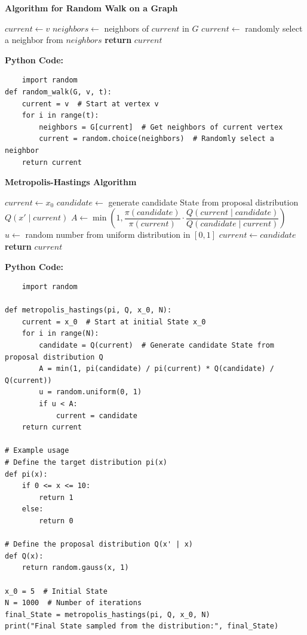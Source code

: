 \documentclass[12pt]{book} %
\begin{document}
\textbf{Algorithm for Random Walk on a Graph}
\FloatBarrier
\begin{algorithm}[H]
\caption{Random Walk on a Graph}
\begin{algorithmic}[1]
    \State $current \gets v$ 
        \State $neighbors \gets$ neighbors of $current$ in $G$
        \State $current \gets$ randomly select a neighbor from $neighbors$
    \EndFor
    \State \textbf{return} $current$
\EndFunction
\end{algorithmic}
\end{algorithm}
\FloatBarrier
\textbf{Python Code:}
\FloatBarrier
\begin{lstlisting}
    import random
def random_walk(G, v, t):
    current = v  # Start at vertex v
    for i in range(t):
        neighbors = G[current]  # Get neighbors of current vertex
        current = random.choice(neighbors)  # Randomly select a neighbor
    return current
\end{lstlisting}
\FloatBarrier
\textbf{Metropolis-Hastings Algorithm}
\FloatBarrier
\begin{algorithm}[H]
\caption{Metropolis-Hastings Algorithm}
\begin{algorithmic}[1]
    \State $current \gets x_0$ 
        \State $candidate \gets$ generate candidate State from proposal distribution \(Q(x' \mid current)\)
        \State $A \gets \min\left(1, \dfrac{\pi(candidate)}{\pi(current)} \cdot \dfrac{Q(current \mid candidate)}{Q(candidate \mid current)}\right)$
        \State $u \gets$ random number from uniform distribution in $[0, 1]$
            \State $current \gets candidate$
        \EndIf
    \EndFor
    \State \textbf{return} $current$
\EndFunction
\end{algorithmic}
\end{algorithm}
\FloatBarrier
\textbf{Python Code:}
\FloatBarrier
\begin{lstlisting}
    import random

def metropolis_hastings(pi, Q, x_0, N):
    current = x_0  # Start at initial State x_0
    for i in range(N):
        candidate = Q(current)  # Generate candidate State from proposal distribution Q
        A = min(1, pi(candidate) / pi(current) * Q(candidate) / Q(current))
        u = random.uniform(0, 1)
        if u < A:
            current = candidate
    return current

# Example usage
# Define the target distribution pi(x)
def pi(x):
    if 0 <= x <= 10:
        return 1
    else:
        return 0

# Define the proposal distribution Q(x' | x)
def Q(x):
    return random.gauss(x, 1)

x_0 = 5  # Initial State
N = 1000  # Number of iterations
final_State = metropolis_hastings(pi, Q, x_0, N)
print("Final State sampled from the distribution:", final_State)
\end{lstlisting}
\end{document}
